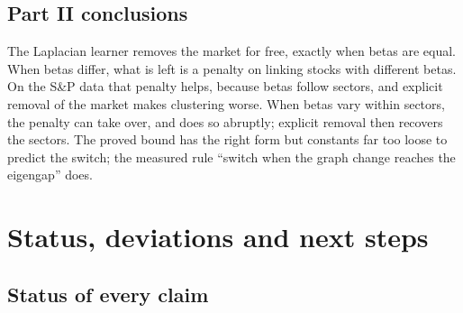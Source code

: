 \documentclass[11pt,a4paper]{article}
\theoremstyle{remark}
\begin{document}
\subsection{Part II conclusions}

The Laplacian learner removes the market for free, exactly when betas are equal. When
betas differ, what is left is a penalty on linking stocks with different betas. On the
S\&P data that penalty helps, because betas follow sectors, and explicit removal of the
market makes clustering worse. When betas vary within sectors, the penalty can take
over, and does so abruptly; explicit removal then recovers the sectors. The proved
bound has the right form but constants far too loose to predict the switch; the
measured rule ``switch when the graph change reaches the eigengap'' does.

\section{Status, deviations and next steps}\label{sec:status}

\subsection{Status of every claim}
\end{document}
